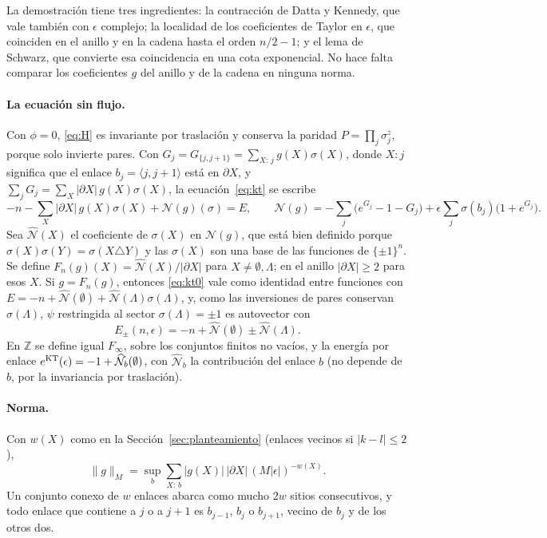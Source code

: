 \documentclass[11pt,a4paper]{article}
\theoremstyle{remark}
\begin{document}
La demostración tiene tres ingredientes: la contracción de Datta y Kennedy, que vale también con
$\epsilon$ complejo; la localidad de los coeficientes de Taylor en $\epsilon$, que coinciden en el
anillo y en la cadena hasta el orden $n/2-1$; y el lema de Schwarz, que convierte esa coincidencia en
una cota exponencial. No hace falta comparar los coeficientes $g$ del anillo y de la cadena en
ninguna norma.

\paragraph{La ecuación sin flujo.} Con $\phi=0$, \eqref{eq:H} es invariante por traslación y conserva
la paridad $P=\prod_j\sigma^z_j$, porque solo invierte pares. Con $G_j=G_{\{j,j+1\}}=\sum_{X:\,j}g(X)\sigma(X)$,
donde $X:j$ significa que el enlace $b_j=\langle j,j{+}1\rangle$ está en $\partial X$, y
$\sum_jG_j=\sum_X|\partial X|\,g(X)\sigma(X)$, la ecuación~\eqref{eq:kt} se escribe
\begin{equation}\label{eq:kt0}
  -n-\sum_X|\partial X|\,g(X)\sigma(X)+\mathcal N(g)(\sigma)=E,\qquad
  \mathcal N(g)=-\sum_j\big(e^{G_j}-1-G_j\big)+\epsilon\sum_j\sigma(b_j)\big(1+e^{G_j}\big).
\end{equation}
Sea $\widehat{\mathcal N}(X)$ el coeficiente de $\sigma(X)$ en $\mathcal N(g)$, que está bien definido
porque $\sigma(X)\sigma(Y)=\sigma(X\triangle Y)$ y las $\sigma(X)$ son una base de las funciones de
$\{\pm1\}^n$. Se define $F_n(g)(X)=\widehat{\mathcal N}(X)/|\partial X|$ para
$X\ne\emptyset,\Lambda$; en el anillo $|\partial X|\ge2$ para esos $X$. Si $g=F_n(g)$, entonces
\eqref{eq:kt0} vale como identidad entre funciones con
$E=-n+\widehat{\mathcal N}(\emptyset)+\widehat{\mathcal N}(\Lambda)\sigma(\Lambda)$, y, como las
inversiones de pares conservan $\sigma(\Lambda)$, $\psi$ restringida al sector $\sigma(\Lambda)=\pm1$ es
autovector con
\begin{equation}\label{eq:Epm}
  E_\pm(n,\epsilon)=-n+\widehat{\mathcal N}(\emptyset)\pm\widehat{\mathcal N}(\Lambda).
\end{equation}
En $\mathbb Z$ se define igual $F_\infty$, sobre los conjuntos finitos no vacíos, y la energía por
enlace $e^{\rm KT}(\epsilon)=-1+\widehat{\mathcal N}_{b}(\emptyset)$, con $\widehat{\mathcal N}_b$ la
contribución del enlace $b$ (no depende de $b$, por la invariancia por traslación).

\paragraph{Norma.} Con $w(X)$ como en la Sección~\ref{sec:planteamiento} (enlaces vecinos si
$|k-l|\le2$),
\[
  \|g\|_M=\sup_b\sum_{X:\,b}|g(X)|\,|\partial X|\,(M|\epsilon|)^{-w(X)} .
\]
Un conjunto conexo de $w$ enlaces abarca como mucho $2w$ sitios consecutivos, y todo enlace que
contiene a $j$ o a $j{+}1$ es $b_{j-1}$, $b_j$ o $b_{j+1}$, vecino de $b_j$ y de los otros dos.
\end{document}
